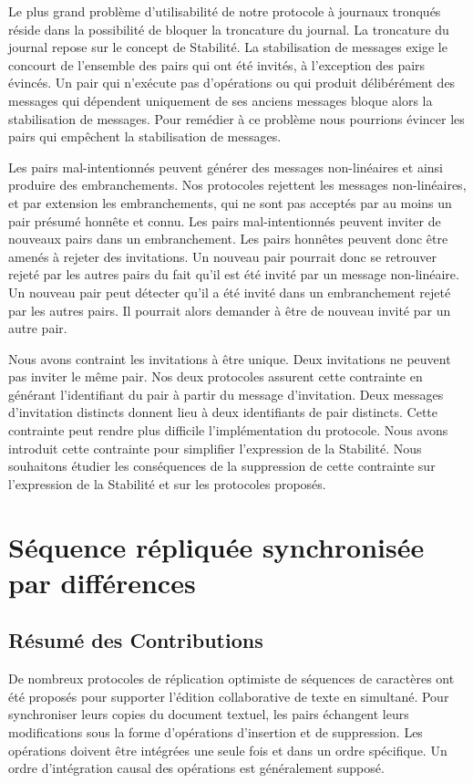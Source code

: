 Le plus grand problème d'utilisabilité de notre protocole à journaux tronqués réside dans la possibilité de bloquer la troncature du journal.
La troncature du journal repose sur le concept de Stabilité.
La stabilisation de messages exige le concourt de l'ensemble des pairs qui ont été invités, à l'exception des pairs évincés.
Un pair qui n'exécute pas d'opérations ou qui produit délibérément des messages qui dépendent uniquement de ses anciens messages bloque alors la stabilisation de messages.
Pour remédier à ce problème nous pourrions évincer les pairs qui empêchent la stabilisation de messages.

Les pairs mal-intentionnés peuvent générer des messages non-linéaires et ainsi produire des embranchements.
Nos protocoles rejettent les messages non-linéaires, et par extension les embranchements, qui ne sont pas acceptés par au moins un pair présumé honnête et connu.
Les pairs mal-intentionnés peuvent inviter de nouveaux pairs dans un embranchement.
Les pairs honnêtes peuvent donc être amenés à rejeter des invitations.
Un nouveau pair pourrait donc se retrouver rejeté par les autres pairs du fait qu'il est été invité par un message non-linéaire.
Un nouveau pair peut détecter qu'il a été invité dans un embranchement rejeté par les autres pairs.
Il pourrait alors demander à être de nouveau invité par un autre pair.

Nous avons contraint les invitations à être unique.
Deux invitations ne peuvent pas inviter le même pair.
Nos deux protocoles assurent cette contrainte en générant l'identifiant du pair à partir du message d'invitation.
Deux messages d'invitation distincts donnent lieu à deux identifiants de pair distincts.
Cette contrainte peut rendre plus difficile l'implémentation du protocole.
Nous avons introduit cette contrainte pour simplifier l'expression de la Stabilité.
Nous souhaitons étudier les conséquences de la suppression de cette contrainte sur l'expression de la Stabilité et sur les protocoles proposés.


\section{Séquence répliquée synchronisée par différences}

\subsection{Résumé des Contributions}

De nombreux protocoles de réplication optimiste de séquences de caractères ont été proposés pour supporter l'édition collaborative de texte en simultané.
Pour synchroniser leurs copies du document textuel, les pairs échangent leurs modifications sous la forme d'opérations d'insertion et de suppression.
Les opérations doivent être intégrées une seule fois et dans un ordre spécifique.
Un ordre d'intégration causal des opérations est généralement supposé.

